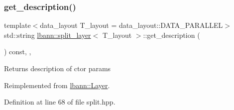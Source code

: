 \subsubsection{\texorpdfstring{get\+\_\+description()}{get\_description()}}
{\footnotesize\ttfamily template$<$data\+\_\+layout T\+\_\+layout = data\+\_\+layout\+::\+D\+A\+T\+A\+\_\+\+P\+A\+R\+A\+L\+L\+EL$>$ \\
std\+::string \hyperlink{classlbann_1_1split__layer}{lbann\+::split\+\_\+layer}$<$ T\+\_\+layout $>$\+::get\+\_\+description (\begin{DoxyParamCaption}{ }\end{DoxyParamCaption}) const\hspace{0.3cm}{\ttfamily [inline]}, {\ttfamily [override]}, {\ttfamily [virtual]}}

Returns description of ctor params 

Reimplemented from \hyperlink{classlbann_1_1Layer_acc0803d3428914ca1eb5988c4309174a}{lbann\+::\+Layer}.



Definition at line 68 of file split.\+hpp.


